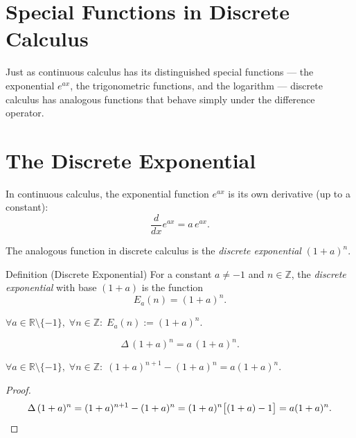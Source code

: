 
\section{Special Functions in Discrete Calculus}
\label{sec:special-functions}

Just as continuous calculus has its distinguished special functions ---
the exponential \(e^{ax}\), the trigonometric functions, and the logarithm
--- discrete calculus has analogous functions that behave simply under the
difference operator.

\section*{The Discrete Exponential}

In continuous calculus, the exponential function \(e^{ax}\) is its own
derivative (up to a constant):
\[
\frac{d}{dx} e^{ax} = a\, e^{ax}.
\]

The analogous function in discrete calculus is the \emph{discrete
exponential} \((1+a)^n\).

\begin{definitionbox}{Definition (Discrete Exponential)}
For a constant \(a \ne -1\) and \(n \in \mathbb{Z}\), the
\emph{discrete exponential} with base \((1+a)\) is the function
\[
E_a(n) = (1+a)^n.
\]
\end{definitionbox}
\label{def:discrete-exponential}

\begin{remark*}
\(\forall a \in \mathbb{R}\setminus\{-1\},\; \forall n \in \mathbb{Z}:\;
E_a(n) := (1+a)^n\).
\end{remark*}

\begin{proposition}
\label{prop:discrete-exponential-rule}
\[
\Delta\,(1+a)^n = a\,(1+a)^n.
\]
\end{proposition}

\begin{remark*}
\(\forall a \in \mathbb{R}\setminus\{-1\},\; \forall n \in \mathbb{Z}:\;
(1+a)^{n+1} - (1+a)^n = a(1+a)^n\).
\end{remark*}

\begin{proof}
\[
\Delta\,(1+a)^n = (1+a)^{n+1} - (1+a)^n = (1+a)^n\bigl[(1+a)-1\bigr] = a(1+a)^n.
\qedhere
\]
\end{proof}

